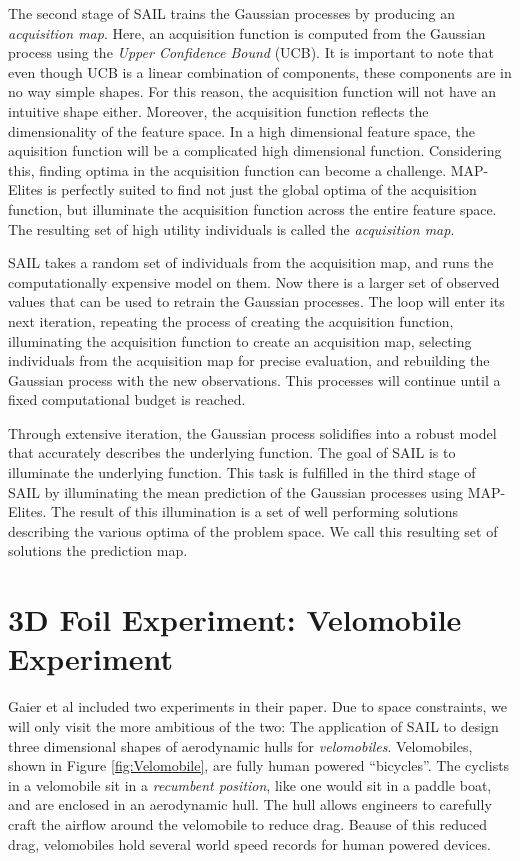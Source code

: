 \documentclass{sig-alternate}
\begin{document}
The second stage of SAIL trains the Gaussian processes by producing an \textit{acquisition map}.
Here, an acquisition function is computed from the Gaussian process using the \textit{Upper Confidence Bound} (UCB).
It is important to note that even though UCB is a linear combination of components, these components are in no way simple shapes.
For this reason, the acquisition function will not have an intuitive shape either.
Moreover, the acquisition function reflects the dimensionality of the feature space.
In a high dimensional feature space, the aquisition function will be a complicated high dimensional function.
Considering this, finding optima in the acquisition function can become a challenge.
MAP-Elites is perfectly suited to find not just the global optima of the acquisition function, but illuminate the acquisition function across the entire feature space.
The resulting set of high utility individuals is called the \textit{acquisition map}. 

SAIL takes a random set of individuals from the acquisition map, and runs the computationally expensive model on them.
Now there is a larger set of observed values that can be used to retrain the Gaussian processes.
The loop will enter its next iteration, repeating the process of creating the acquisition function, illuminating the acquisition function to create an acquisition map, selecting individuals from the acquisition map for precise evaluation, and rebuilding the Gaussian process with the new observations.
This processes will continue until a fixed computational budget is reached.

Through extensive iteration, the Gaussian process solidifies into a robust model that accurately describes the underlying function.
The goal of SAIL is to illuminate the underlying function.
This task is fulfilled in the third stage of SAIL by illuminating the mean prediction of the Gaussian processes using MAP-Elites.
The result of this illumination is a set of well performing solutions describing the various optima of the problem space.
We call this resulting set of solutions the prediction map.

\section{3D Foil Experiment: Velomobile Experiment}
\label{3DFoilExperiment}

Gaier et al included two experiments in their paper.
Due to space constraints, we will only visit the more ambitious of the two:
The application of SAIL to design three dimensional shapes of aerodynamic hulls for \textit{velomobiles}.
Velomobiles, shown in Figure \ref{fig:Velomobile}, are fully human powered ``bicycles''.
The cyclists in a velomobile sit in a \textit{recumbent position}, like one would sit in a paddle boat, and are enclosed in an aerodynamic hull.
The hull allows engineers to carefully craft the airflow around the velomobile to reduce drag.
Beause of this reduced drag, velomobiles hold several world speed records for human powered devices.
\end{document}
